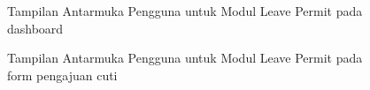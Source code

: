 \begin{figure}[H]
\centering
{}
\caption{Tampilan Antarmuka Pengguna untuk Modul Leave Permit pada dashboard}
\label{fig:leave_permit_dashboard}
\end{figure}

\begin{figure}
\centering
{}
\caption{Tampilan Antarmuka Pengguna untuk Modul Leave Permit pada form pengajuan cuti}
\label{fig:leave_permit_oic}
\end{figure}

